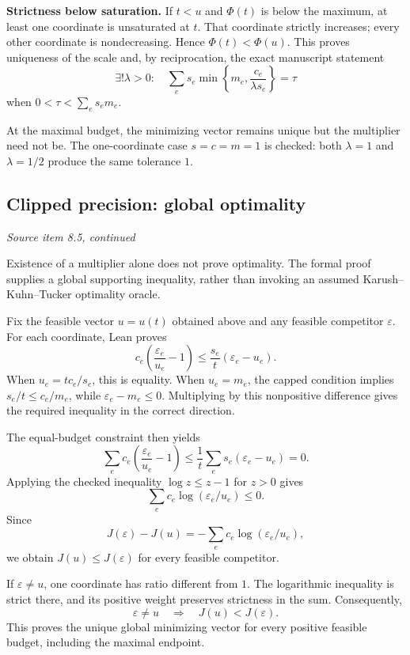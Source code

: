 \textbf{Strictness below saturation.} If $t<u$ and $\Phi(t)$ is below the maximum, at least one coordinate is unsaturated at $t$. That coordinate strictly increases; every other coordinate is nondecreasing. Hence $\Phi(t)<\Phi(u)$. This proves uniqueness of the scale and, by reciprocation, the exact manuscript statement
\[
\boxed{\exists!\lambda>0:\quad
\sum_e s_e\min\!\left\{m_e,\frac{c_e}{\lambda s_e}\right\}=\tau}
\]
when $0<\tau<\sum_es_em_e$.

At the maximal budget, the minimizing vector remains unique but the multiplier need not be. The one-coordinate case $s=c=m=1$ is checked: both $\lambda=1$ and $\lambda=1/2$ produce the same tolerance $1$.



\subsection{Clipped precision: global optimality}\label{supp4:subsection:006}\textit{Source item 8.5, continued}\par
Existence of a multiplier alone does not prove optimality. The formal proof supplies a global supporting inequality, rather than invoking an assumed Karush--Kuhn--Tucker optimality oracle.

Fix the feasible vector $u=u(t)$ obtained above and any feasible competitor $\varepsilon$. For each coordinate, Lean proves
\[
\boxed{
 c_e\left(\frac{\varepsilon_e}{u_e}-1\right)
 \le \frac{s_e}{t}(\varepsilon_e-u_e).
}
\]
When $u_e=tc_e/s_e$, this is equality. When $u_e=m_e$, the capped condition implies $s_e/t\le c_e/m_e$, while $\varepsilon_e-m_e\le0$. Multiplying by this nonpositive difference gives the required inequality in the correct direction.

The equal-budget constraint then yields
\[
\sum_e c_e\left(\frac{\varepsilon_e}{u_e}-1\right)
\le\frac1t\sum_e s_e(\varepsilon_e-u_e)=0.
\]
Applying the checked inequality $\log z\le z-1$ for $z>0$ gives
\[
\sum_e c_e\log(\varepsilon_e/u_e)\le0.
\]
Since
\[
J(\varepsilon)-J(u)
=-\sum_e c_e\log(\varepsilon_e/u_e),
\]
we obtain $J(u)\le J(\varepsilon)$ for every feasible competitor.

If $\varepsilon\ne u$, one coordinate has ratio different from $1$. The logarithmic inequality is strict there, and its positive weight preserves strictness in the sum. Consequently,
\[
\boxed{\varepsilon\ne u\quad\Longrightarrow\quad J(u)<J(\varepsilon).}
\]
This proves the unique global minimizing vector for every positive feasible budget, including the maximal endpoint.

